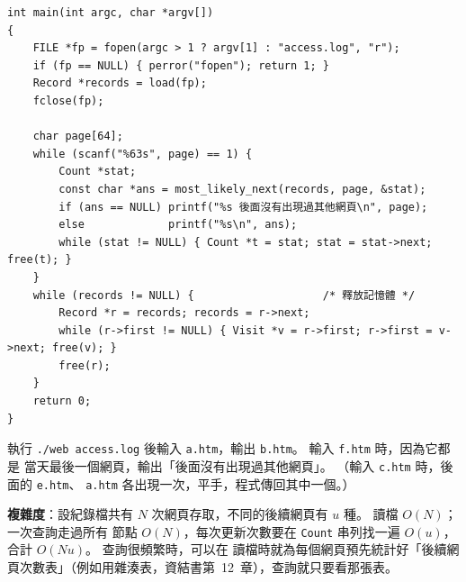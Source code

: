 \begin{pastsoln}
\begin{verbatim}
int main(int argc, char *argv[])
{
    FILE *fp = fopen(argc > 1 ? argv[1] : "access.log", "r");
    if (fp == NULL) { perror("fopen"); return 1; }
    Record *records = load(fp);
    fclose(fp);

    char page[64];
    while (scanf("%63s", page) == 1) {
        Count *stat;
        const char *ans = most_likely_next(records, page, &stat);
        if (ans == NULL) printf("%s 後面沒有出現過其他網頁\n", page);
        else             printf("%s\n", ans);
        while (stat != NULL) { Count *t = stat; stat = stat->next; free(t); }
    }
    while (records != NULL) {                    /* 釋放記憶體 */
        Record *r = records; records = r->next;
        while (r->first != NULL) { Visit *v = r->first; r->first = v->next; free(v); }
        free(r);
    }
    return 0;
}
\end{verbatim}
執行 \texttt{./web access.log} 後輸入 \texttt{a.htm}，輸出 \texttt{b.htm}。 輸入 \texttt{f.htm} 時，因為它都是
當天最後一個網頁，輸出「後面沒有出現過其他網頁」。 （輸入 \texttt{c.htm} 時，後面的 \texttt{e.htm}、
\texttt{a.htm} 各出現一次，平手，程式傳回其中一個。）

\textbf{複雜度}：設紀錄檔共有 $N$ 次網頁存取，不同的後續網頁有 $u$ 種。 讀檔 $O(N)$；一次查詢走過所有
節點 $O(N)$，每次更新次數要在 \texttt{Count} 串列找一遍 $O(u)$，合計 $O(N u)$。 查詢很頻繁時，可以在
讀檔時就為每個網頁預先統計好「後續網頁次數表」（例如用雜湊表，資結書第~12~章），查詢就只要看那張表。
\end{pastsoln}
